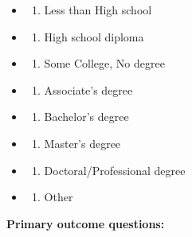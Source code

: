 \documentclass[
]{article}
\providecommand{\tightlist}{%
  \setlength{\itemsep}{0pt}\setlength{\parskip}{0pt}}
\begin{document}
\begin{itemize}
\item
  \begin{enumerate}
  \def\labelenumi{\alph{enumi}.}
  \tightlist
  \item
    Less than High school
  \end{enumerate}
\item
  \begin{enumerate}
  \def\labelenumi{\alph{enumi}.}
  \setcounter{enumi}{1}
  \tightlist
  \item
    High school diploma
  \end{enumerate}
\item
  \begin{enumerate}
  \def\labelenumi{\alph{enumi}.}
  \setcounter{enumi}{2}
  \tightlist
  \item
    Some College, No degree
  \end{enumerate}
\item
  \begin{enumerate}
  \def\labelenumi{\alph{enumi}.}
  \setcounter{enumi}{3}
  \tightlist
  \item
    Associate's degree
  \end{enumerate}
\item
  \begin{enumerate}
  \def\labelenumi{\alph{enumi}.}
  \setcounter{enumi}{4}
  \tightlist
  \item
    Bachelor's degree
  \end{enumerate}
\item
  \begin{enumerate}
  \def\labelenumi{\alph{enumi}.}
  \setcounter{enumi}{5}
  \tightlist
  \item
    Master's degree
  \end{enumerate}
\item
  \begin{enumerate}
  \def\labelenumi{\alph{enumi}.}
  \setcounter{enumi}{6}
  \tightlist
  \item
    Doctoral/Professional degree
  \end{enumerate}
\item
  \begin{enumerate}
  \def\labelenumi{\alph{enumi}.}
  \setcounter{enumi}{7}
  \tightlist
  \item
    Other
  \end{enumerate}
\end{itemize}

\textbf{Primary outcome questions:}
\end{document}
